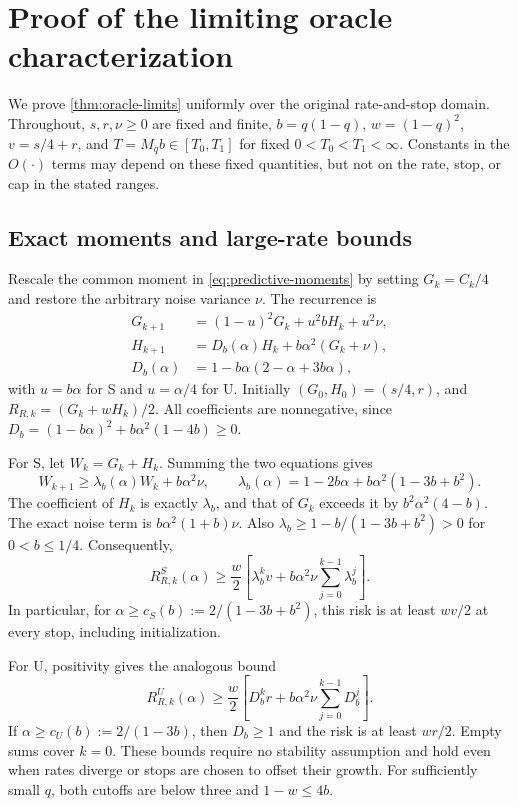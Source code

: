 \section{Proof of the limiting oracle characterization}
\label{sec:oracle-limit-proofs}

We prove \cref{thm:oracle-limits} uniformly over the original rate-and-stop
domain. Throughout, $s,r,\nu\geq0$ are fixed and finite,
$b=q(1-q)$, $w=(1-q)^2$, $v=s/4+r$, and $T=M_qb\in[T_0,T_1]$ for fixed
$0<T_0<T_1<\infty$. Constants in the $O(\cdot)$ terms may depend on these
fixed quantities, but not on the rate, stop, or cap in the stated ranges.

\subsection{Exact moments and large-rate bounds}

Rescale the common moment in \cref{eq:predictive-moments} by setting
$G_k=C_k/4$ and restore the arbitrary noise variance $\nu$. The recurrence is
\begin{equation}
  \begin{aligned}
    G_{k+1}&=(1-u)^2G_k+u^2bH_k+u^2\nu,\\
    H_{k+1}&=D_b(\alpha)H_k+b\alpha^2(G_k+\nu),\\
    D_b(\alpha)&=1-b\alpha(2-\alpha+3b\alpha),
  \end{aligned}
  \label{eq:limit-moments}
\end{equation}
with $u=b\alpha$ for S and $u=\alpha/4$ for U. Initially
$(G_0,H_0)=(s/4,r)$, and $R_{R,k}=(G_k+wH_k)/2$. All coefficients are
nonnegative, since
$D_b=(1-b\alpha)^2+b\alpha^2(1-4b)\geq0$.

For S, let $W_k=G_k+H_k$. Summing the two equations gives
\[
  W_{k+1}\geq\lambda_b(\alpha)W_k+b\alpha^2\nu,
  \qquad
  \lambda_b(\alpha)=1-2b\alpha+b\alpha^2(1-3b+b^2).
\]
The coefficient of $H_k$ is exactly $\lambda_b$, and that of $G_k$ exceeds it
by $b^2\alpha^2(4-b)$. The exact noise term is $b\alpha^2(1+b)\nu$.
Also $\lambda_b\geq1-b/(1-3b+b^2)>0$ for $0<b\leq1/4$. Consequently,
\[
  R^S_{R,k}(\alpha)\geq\frac w2\left[
    \lambda_b^kv+b\alpha^2\nu\sum_{j=0}^{k-1}\lambda_b^j\right].
\]
In particular, for $\alpha\geq c_S(b):=2/(1-3b+b^2)$, this risk is at least
$wv/2$ at every stop, including initialization.

For U, positivity gives the analogous bound
\[
  R^U_{R,k}(\alpha)\geq\frac w2\left[
    D_b^kr+b\alpha^2\nu\sum_{j=0}^{k-1}D_b^j\right].
\]
If $\alpha\geq c_U(b):=2/(1-3b)$, then $D_b\geq1$ and the risk is at least
$wr/2$. Empty sums cover $k=0$. These bounds require no stability assumption
and hold even when rates diverge or stops are chosen to offset their growth.
For sufficiently small $q$, both cutoffs are below three and $1-w\leq4b$.

